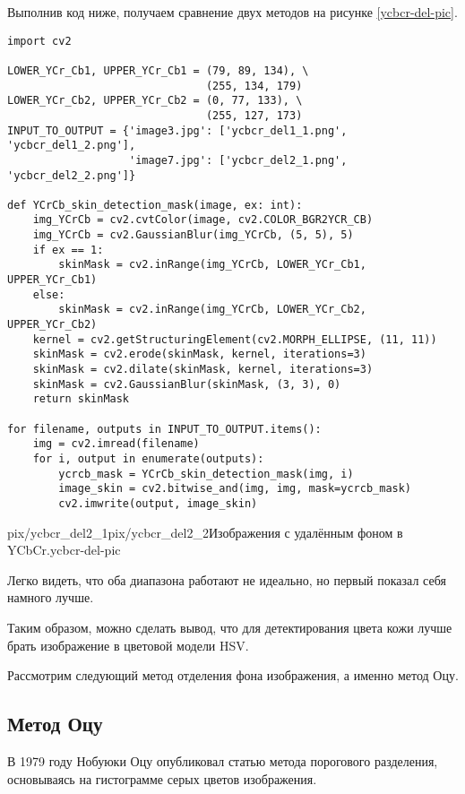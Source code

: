 Выполнив код ниже, получаем сравнение двух методов на рисунке \ref{ycbcr-del-pic}.

\begin{verbatim}
import cv2

LOWER_YCr_Cb1, UPPER_YCr_Cb1 = (79, 89, 134), \
                               (255, 134, 179)
LOWER_YCr_Cb2, UPPER_YCr_Cb2 = (0, 77, 133), \
                               (255, 127, 173)
INPUT_TO_OUTPUT = {'image3.jpg': ['ycbcr_del1_1.png', 'ycbcr_del1_2.png'],
                   'image7.jpg': ['ycbcr_del2_1.png', 'ycbcr_del2_2.png']}

def YCrCb_skin_detection_mask(image, ex: int):
    img_YCrCb = cv2.cvtColor(image, cv2.COLOR_BGR2YCR_CB)
    img_YCrCb = cv2.GaussianBlur(img_YCrCb, (5, 5), 5)
    if ex == 1:
        skinMask = cv2.inRange(img_YCrCb, LOWER_YCr_Cb1, UPPER_YCr_Cb1)
    else:
        skinMask = cv2.inRange(img_YCrCb, LOWER_YCr_Cb2, UPPER_YCr_Cb2)
    kernel = cv2.getStructuringElement(cv2.MORPH_ELLIPSE, (11, 11))
    skinMask = cv2.erode(skinMask, kernel, iterations=3)
    skinMask = cv2.dilate(skinMask, kernel, iterations=3)
    skinMask = cv2.GaussianBlur(skinMask, (3, 3), 0)
    return skinMask

for filename, outputs in INPUT_TO_OUTPUT.items():
    img = cv2.imread(filename)
    for i, output in enumerate(outputs):
        ycrcb_mask = YCrCb_skin_detection_mask(img, i)
        image_skin = cv2.bitwise_and(img, img, mask=ycrcb_mask)
        cv2.imwrite(output, image_skin)
\end{verbatim}

\newpage

{pix/ycbcr_del2_1}{pix/ycbcr_del2_2}{Изображения с удалённым
фоном в YCbCr.}{ycbcr-del-pic}

Легко видеть, что оба диапазона работают не идеально, но первый 
показал себя намного лучше. 

Таким образом, можно сделать вывод, что для детектирования цвета кожи 
лучше брать изображение в цветовой модели HSV. 

Рассмотрим следующий метод отделения фона изображения, а именно метод
Оцу.

\subsection{Метод Оцу}

В 1979 году Нобуюки Оцу опубликовал статью \cite{otsu} метода порогового 
разделения, основываясь на гистограмме серых цветов изображения. 

